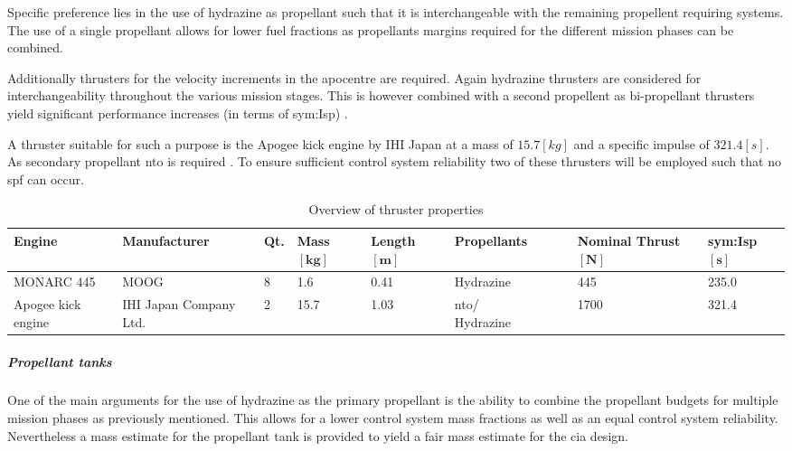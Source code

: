 Specific preference lies in the use of hydrazine as propellant such that it is interchangeable with the remaining propellent requiring systems. The use of a single propellant allows for lower fuel fractions as propellants margins required for the different mission phases can be combined.

Additionally thrusters for the velocity increments in the apocentre are required. Again hydrazine thrusters are considered for interchangeability throughout the various mission stages. This is however combined with a second propellent as bi-propellant thrusters yield significant performance increases (in terms of \gls{sym:Isp}) \cite{Wertz2011}. 

A thruster suitable for such a purpose is the Apogee kick engine by IHI Japan at a mass of $15.7 \left[kg\right]$ and a specific impulse of $321.4 \left[s\right]$. As secondary propellant \gls{nto} is required \cite[p.538]{Wertz2011}. To ensure sufficient control system reliability two of these thrusters will be employed such that no \gls{spf} can occur.  %


\begin{table}[h]
	\centering
\caption[Overview of thruster properties]{Overview of thruster properties \cite[p.538]{Wertz2011}}
\label{tab:thrusters}
\hspace{-5mm}
\begin{tabular}{|p{}|p{}|p{}|p{}|p{}|p{}|p{}|l|} \hline 
\textbf{Engine    }          &\textbf{ Manufacturer }         & \textbf{Qt.} &\textbf{Mass $\mathbf{[kg]}$}      & \textbf{Length $\mathbf{[m]}$} & \textbf{Propellants}  & \textbf{Nominal Thrust $\mathbf{[N]}$} & \textbf{\gls{sym:Isp} $\mathbf{[s]}$} \\ \hline \hline
MONARC 445          & MOOG                  & 8        & 1.6  & 0.41 & Hydrazine     & 445         & 235.0    \\ \hline
Apogee kick engine & IHI Japan Company Ltd. & 2        & 15.7 & 1.03 & \gls{nto}/ ~~~~~ Hydrazine & 1700        & 321.4    \\ \hline
\end{tabular}
\end{table}


\subparagraph{Propellant tanks}
One of the main arguments for the use of hydrazine as the primary propellant is the ability to combine the propellant budgets for multiple mission phases as previously mentioned. This allows for a lower control system mass fractions as well as an equal control system reliability. Nevertheless a mass estimate for the propellant tank is provided to yield a fair mass estimate for the \gls{cia} design. 

